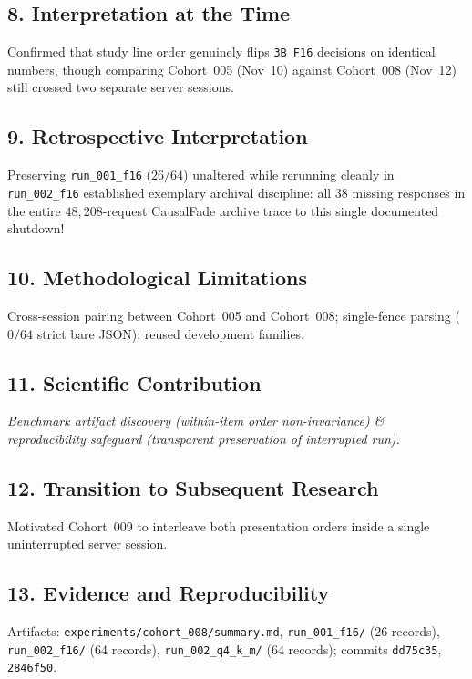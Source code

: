 \subsection*{8. Interpretation at the Time}
Confirmed that study line order genuinely flips \texttt{3B F16} decisions on identical numbers, though comparing Cohort~005 (Nov~10) against Cohort~008 (Nov~12) still crossed two separate server sessions.

\subsection*{9. Retrospective Interpretation}
Preserving \texttt{run\_001\_f16} ($26/64$) unaltered while rerunning cleanly in \texttt{run\_002\_f16} established exemplary archival discipline: all $38$ missing responses in the entire $48{,}208$-request CausalFade archive trace to this single documented shutdown!

\subsection*{10. Methodological Limitations}
Cross-session pairing between Cohort~005 and Cohort~008; single-fence parsing ($0/64$ strict bare JSON); reused development families.

\subsection*{11. Scientific Contribution}
\emph{Benchmark artifact discovery (within-item order non-invariance) \& reproducibility safeguard (transparent preservation of interrupted run).}

\subsection*{12. Transition to Subsequent Research}
Motivated Cohort~009 to interleave both presentation orders inside a single uninterrupted server session.

\subsection*{13. Evidence and Reproducibility}
Artifacts: \texttt{experiments/cohort\_008/summary.md}, \texttt{run\_001\_f16/} ($26$ records), \texttt{run\_002\_f16/} ($64$ records), \texttt{run\_002\_q4\_k\_m/} ($64$ records); commits \texttt{dd75c35}, \texttt{2846f50}.

